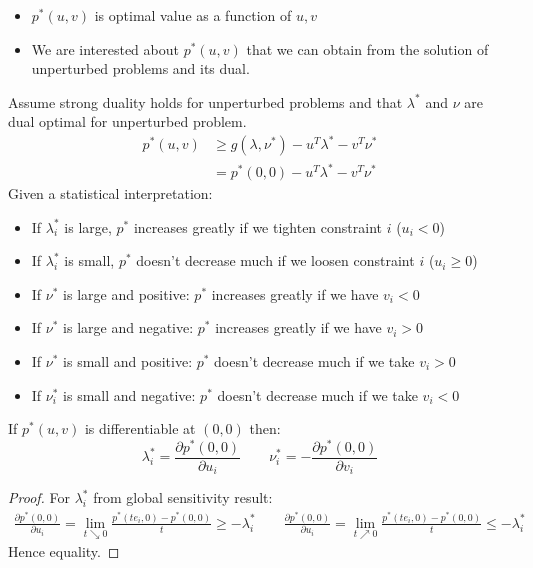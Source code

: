 \begin{remark}
\begin{itemize}
        \item $p^*(u, v)$ is optimal value as a function of $u,v$
        \item We are interested about $p^*(u, v)$ that we can obtain from the solution of unperturbed problems and its dual.
    \end{itemize}
    Assume strong duality holds for unperturbed problems and that $\lambda^*$ and $\nu$ are dual optimal for unperturbed problem.
    \begin{equation*}
    \begin{aligned}
        p^*(u, v) &\ge g(\lambda, \nu^*) - u^T\lambda^* - v^T\nu^* \\ 
        &=p^*(0,0) - u^T\lambda^* - v^T\nu^*
    \end{aligned}
    \end{equation*}
    Given a statistical interpretation:
    \begin{itemize}
        \item If $\lambda_i^*$ is large, $p^*$ increases greatly if we tighten constraint $i$ ($u_i<0$)
        \item If $\lambda_i^*$ is small, $p^*$ doesn't decrease much if we loosen constraint $i$ ($u_i\ge0$)
        \item If $\nu^*$ is large and positive: $p^*$ increases greatly if we have $v_i<0$
        \item If $\nu^*$ is large and negative: $p^*$ increases greatly if we have $v_i>0$
        \item If $\nu^*$ is small and positive: $p^*$ doesn't decrease much if we take $v_i>0$ 
        \item If $\nu^*_i$ is small and negative: $p^*$ doesn't decrease much if we take $v_i<0$
    \end{itemize}
\end{remark}

\begin{lemma}
    If $p^*(u, v)$ is differentiable at $(0,0)$ then:
    \begin{equation*}
        \lambda^*_i = \frac{\partial p^*(0,0)}{\partial u_i} \qquad \nu^*_i = -\frac{\partial p^*(0,0)}{\partial v_i}
    \end{equation*}
\end{lemma}
\begin{proof}
    For $\lambda^*_i$ from global sensitivity result:
    \begin{equation*}
    \begin{aligned}
        \frac{\partial p^*(0,0)}{\partial u_i} = \lim_{t\searrow0}\frac{p^*(te_i, 0) - p^*(0,0)}{t} \ge -\lambda^*_i \qquad
        \frac{\partial p^*(0,0)}{\partial u_i} = \lim_{t\nearrow0}\frac{p^*(te_i, 0) - p^*(0,0)}{t} \le -\lambda^*_i
    \end{aligned}
    \end{equation*}
    Hence equality.
\end{proof}


